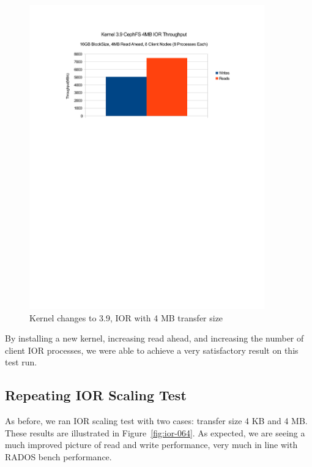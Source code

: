\documentclass{article}
\begin{document}
\begin{figure}[htb]
\centering
\includegraphics[width=4in]{ior-kernel-39}
\caption{Kernel changes to 3.9, IOR with 4 MB transfer size}
\label{fig:ior-kernel-39}
\end{figure}


By installing a new kernel, increasing read ahead, and increasing the number of
client IOR processes, we were able to achieve a very satisfactory result on this
test run.


\subsection{Repeating IOR Scaling Test}

As before, we ran IOR scaling test with two cases: transfer size 4 KB and 4 MB.
These results are illustrated in Figure~\ref{fig:ior-064}. As expected, we are
seeing a much improved picture of read and write performance, very much in
line with RADOS bench performance.
\end{document}
